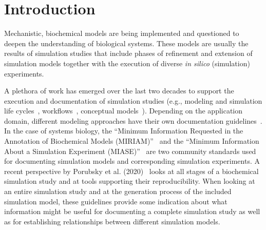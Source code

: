 \documentclass[10pt,letterpaper]{article}
\begin{document}
\section*{Introduction}


Mechanistic, biochemical models are being implemented and questioned to deepen the understanding of biological systems.
These models are usually the results of simulation studies that include phases of refinement and extension of simulation models together with the execution of diverse \textit{in silico} (simulation) experiments.

A plethora of work has emerged over the last two decades to support the execution and documentation of simulation studies (e.g., modeling and simulation life cycles~\cite{Balci2012}, workflows~\cite{Ruscheinski2019}, conceptual models~\cite{Wilsdorf2020b}).
Depending on the application domain, different modeling approaches have their own documentation guidelines~\cite{Monks2018, Erdemir2012, Grimm2010}.
In the case of systems biology, the \enquote{Minimum Information Requested in the Annotation of Biochemical Models (MIRIAM)}~\cite{LeNovere2005} and the \enquote{Minimum Information About a Simulation Experiment (MIASE)}~\cite{Waltemath2011} are two community standards used for documenting simulation models and corresponding simulation experiments.
A recent perspective by Porubsky et al. (2020)~\cite{Porubsky2020} looks at all stages of a biochemical simulation study and at tools supporting their reproducibility.
When looking at an entire simulation study and at the generation process of the included simulation model, these guidelines provide some indication about what information might be useful for documenting a complete simulation study as well as for establishing relationships between different simulation models.
\end{document}
